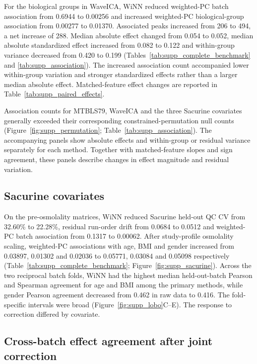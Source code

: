 \documentclass[namedate,webpdf,modern,large,nocrop]{oup-authoring-template}
\begin{document}
For the biological groups in WaveICA, WiNN reduced weighted-PC batch association from 0.6944 to 0.00256 and increased weighted-PC biological-group association from 0.00277 to 0.01370. Associated peaks increased from 206 to 494, a net increase of 288. Median absolute effect changed from 0.054 to 0.052, median absolute standardized effect increased from 0.082 to 0.122 and within-group variance decreased from 0.420 to 0.199 (Tables~\ref{tab:supp_complete_benchmark} and \ref{tab:supp_association}). The increased association count accompanied lower within-group variation and stronger standardized effects rather than a larger median absolute effect. Matched-feature effect changes are reported in Table~\ref{tab:supp_paired_effects}.

Association counts for MTBLS79, WaveICA and the three Sacurine covariates generally exceeded their corresponding constrained-permutation null counts (Figure~\ref{fig:supp_permutation}; Table~\ref{tab:supp_association}). The accompanying panels show absolute effects and within-group or residual variance separately for each method. Together with matched-feature slopes and sign agreement, these panels describe changes in effect magnitude and residual variation.

\subsection{Sacurine covariates}

On the pre-osmolality matrices, WiNN reduced Sacurine held-out QC CV from 32.60\% to 22.28\%, residual run-order drift from 0.0684 to 0.0512 and weighted-PC batch association from 0.1317 to 0.00062. After study-profile osmolality scaling, weighted-PC associations with age, BMI and gender increased from 0.03897, 0.01302 and 0.02036 to 0.05771, 0.03084 and 0.05098 respectively (Table~\ref{tab:supp_complete_benchmark}; Figure~\ref{fig:supp_sacurine}). Across the two reciprocal batch folds, WiNN had the highest median held-out-batch Pearson and Spearman agreement for age and BMI among the primary methods, while gender Pearson agreement decreased from 0.462 in raw data to 0.416. The fold-specific intervals were broad (Figure~\ref{fig:supp_lobo}C--E). The response to correction differed by covariate.

\subsection{Cross-batch effect agreement after joint correction}
\end{document}
